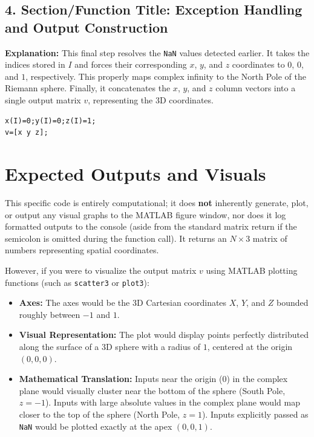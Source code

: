 \subsection*{4. Section/Function Title: Exception Handling and Output Construction}
\textbf{Explanation:} This final step resolves the \texttt{NaN} values detected earlier. It takes the indices stored in $I$ and forces their corresponding $x$, $y$, and $z$ coordinates to $0$, $0$, and $1$, respectively. This properly maps complex infinity to the North Pole of the Riemann sphere. Finally, it concatenates the $x$, $y$, and $z$ column vectors into a single output matrix $v$, representing the 3D coordinates.

\begin{lstlisting}
x(I)=0;y(I)=0;z(I)=1;
v=[x y z];
\end{lstlisting}

\section{Expected Outputs and Visuals}

This specific code is entirely computational; it does \textbf{not} inherently generate, plot, or output any visual graphs to the MATLAB figure window, nor does it log formatted outputs to the console (aside from the standard matrix return if the semicolon is omitted during the function call). It returns an $N \times 3$ matrix of numbers representing spatial coordinates.

However, if you were to visualize the output matrix $v$ using MATLAB plotting functions (such as \texttt{scatter3} or \texttt{plot3}):
\begin{itemize}
    \item \textbf{Axes:} The axes would be the 3D Cartesian coordinates $X$, $Y$, and $Z$ bounded roughly between $-1$ and $1$.
    \item \textbf{Visual Representation:} The plot would display points perfectly distributed along the surface of a 3D sphere with a radius of $1$, centered at the origin $(0,0,0)$. 
    \item \textbf{Mathematical Translation:} Inputs near the origin ($0$) in the complex plane would visually cluster near the bottom of the sphere (South Pole, $z=-1$). Inputs with large absolute values in the complex plane would map closer to the top of the sphere (North Pole, $z=1$). Inputs explicitly passed as \texttt{NaN} would be plotted exactly at the apex $(0,0,1)$.
\end{itemize}
